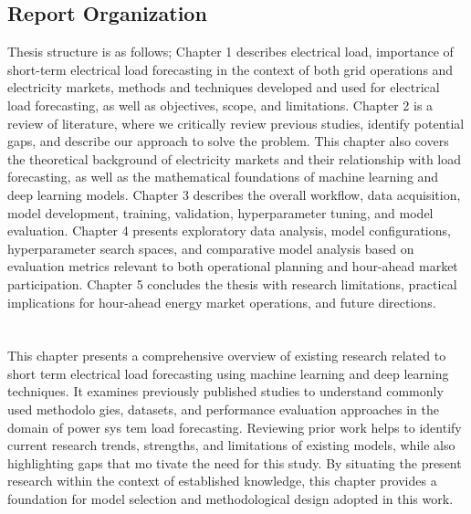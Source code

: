 \documentclass[oneside, 12pt]{book}
\numberwithin{equation}{chapter}
\newcommand{\sizexii}{\fontsize{12pt}{6pt}\selectfont}
\begin{document}
\section{\sizexii Report Organization}
Thesis structure is as follows; Chapter 1 describes electrical load, importance of short-term electrical load forecasting in the context of both grid operations and electricity markets, methods and techniques developed and used for electrical load forecasting, as well as objectives, scope, and limitations. Chapter 2 is a review of literature, where we critically review previous studies, identify potential gaps, and describe our approach to solve the problem. This chapter also covers the theoretical background of electricity markets and their relationship with load forecasting, as well as the mathematical foundations of machine learning and deep learning models. Chapter 3 describes the overall workflow, data acquisition, model development, training, validation, hyperparameter tuning, and model evaluation. Chapter 4 presents exploratory data analysis, model configurations, hyperparameter search spaces, and comparative model analysis based on evaluation metrics relevant to both operational planning and hour-ahead market participation. Chapter 5 concludes the thesis with research limitations, practical implications for hour-ahead energy market operations, and future directions.




\chapter*{\vspace{-1in}\centering {\sizexii  CHAPTER TWO: LITERATURE REVIEW}}
\setcounter{chapter}{2}
\setcounter{section}{0}
\setcounter{equation}{0}
\setcounter{figure}{0}
\setcounter{table}{0}
\vspace{-12pt}

This chapter presents a comprehensive overview of existing research related to short
term electrical load forecasting using machine learning and deep learning techniques.
It examines previously published studies to understand commonly used methodolo
gies, datasets, and performance evaluation approaches in the domain of power sys
tem load forecasting. Reviewing prior work helps to identify current research trends,
strengths, and limitations of existing models, while also highlighting gaps that mo
tivate the need for this study. By situating the present research within the context
of established knowledge, this chapter provides a foundation for model selection and
methodological design adopted in this work.
\end{document}
